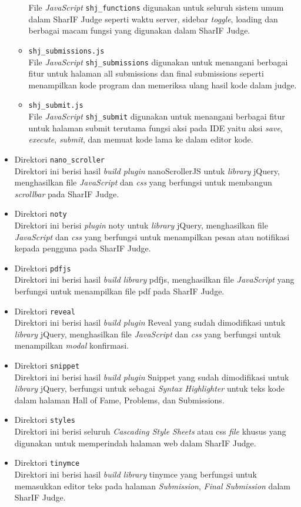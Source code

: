 \begin{itemize}
\begin{itemize}
		            File \textit{JavaScript} \verb|shj_functions| digunakan untuk seluruh sistem umum dalam SharIF Judge seperti waktu server, sidebar \textit{toggle}, loading dan berbagai macam fungsi yang digunakan dalam SharIF Judge.
		      \item \verb|shj_submissions.js| \\
		            File \textit{JavaScript} \verb|shj_submissions| digunakan untuk menangani berbagai fitur untuk halaman all submissions dan final submissions seperti menampilkan kode program dan memeriksa ulang hasil kode dalam judge.
		      \item \verb|shj_submit.js| \\
		            File \textit{JavaScript} \verb|shj_submit| digunakan untuk menangani berbagai fitur untuk halaman submit terutama fungsi aksi pada IDE yaitu aksi \textit{save}, \textit{execute}, \textit{submit}, dan memuat kode lama ke dalam editor kode.
	      \end{itemize}
	\item Direktori \verb|nano_scroller| \\
	      Direktori ini berisi hasil \textit{build plugin} nanoScrollerJS untuk \textit{library} jQuery, menghasilkan file \textit{JavaScript} dan \textit{css} yang berfungsi untuk membangun \textit{scrollbar} pada SharIF Judge.
	\item Direktori \verb|noty| \\
	      Direktori ini berisi \textit{plugin} noty untuk \textit{library} jQuery, menghasilkan file \textit{JavaScript} dan \textit{css} yang berfungsi untuk menampilkan pesan atau notifikasi kepada pengguna pada SharIF Judge.
	\item Direktori \verb|pdfjs| \\
	      Direktori ini berisi hasil \textit{build library} pdfjs, menghasilkan file \textit{JavaScript} yang berfungsi untuk menampilkan file pdf pada SharIF Judge.
	\item Direktori \verb|reveal| \\
	      Direktori ini berisi hasil \textit{build plugin} Reveal yang sudah dimodifikasi untuk \textit{library} jQuery, menghasilkan file \textit{JavaScript} dan \textit{css} yang berfungsi untuk menampilkan \textit{modal} konfirmasi.
	\item Direktori \verb|snippet| \\
	      Direktori ini berisi hasil \textit{build plugin} Snippet yang sudah dimodifikasi untuk \textit{library} jQuery, berfungsi untuk sebagai \textit{Syntax Highlighter} untuk teks kode dalam halaman Hall of Fame, Problems, dan Submissions.
	\item Direktori \verb|styles| \\
	      Direktori ini berisi seluruh \textit{Cascading Style Sheets} atau css \textit{file} khusus yang digunakan untuk memperindah halaman web dalam SharIF Judge.
	\item Direktori \verb|tinymce| \\
	      Direktori ini berisi hasil \textit{build library} tinymce yang berfungsi  untuk memasukkan editor teks pada halaman \textit{Submission}, \textit{Final Submission} dalam SharIF Judge.
\end{itemize}

